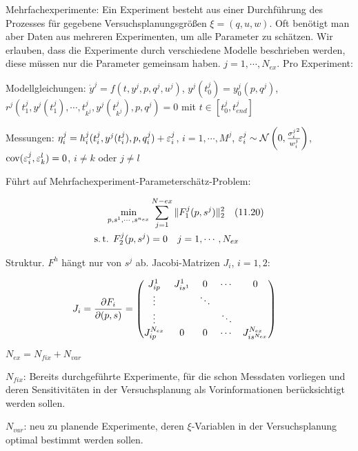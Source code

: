 \bitm
\item Mehrfachexperimente: Ein Experiment besteht aus einer Durchführung des Prozesses für gegebene Versuchsplanungsgrößen $\xi = (q,u,w)$. Oft benötigt man aber Daten aus mehreren Experimenten, um alle Parameter zu schätzen.
Wir erlauben, dass die Experimente durch verschiedene Modelle beschrieben werden, diese müssen nur die Parameter gemeinsam haben. $j=1,\cdots,N_{ex}$. Pro Experiment:
\bitm
\item Modellgleichungen: $\dot y^j = f(t,y^j,p,q^j,u^j)$, $y^j(t_0^j) = y_0^j(p,q^j)$, $r^j(t_1^j, y^j(t_1^j), \cdots, t_{k^j}^j, y^j(t_{k^j}^j), p, q^j) = 0$ mit $t \in [t_0^j, t_{end}^j]$
\item Messungen: $\eta_i^j = h_i^j (t_i^j, y^j(t_i^j),p,q_i^j) + \varepsilon_i^j$, $i = 1,\cdots,M^j$, $\varepsilon_i^j \sim \mathcal N \left(0, \frac{{\sigma_i^j}^2}{w_i^j} \right)$, $\mathrm{cov} (\varepsilon_i^j, \varepsilon_k^l) = 0$, $i\neq k$ oder $j\neq l$
\item
\eitm
\eitm

Führt auf Mehrfachexperiment-Parameterschätz-Problem:

\begin{align*}
\min_{p,s^1, \cdots, s^{n_{ex}}} &\sum\limits_{j=1}^{N-{ex}} \|F_1^j(p,s^j)\|_2^2 \quad (11.20) \\
\text{s.\,t. } F_2^j(p,s^j) &= 0 \quad j = 1,\cdots, N_{ex} \\
\end{align*}

Struktur. $F^h$ hängt nur von $s^j$ ab. Jacobi-Matrizen $J_i$, $i=1,2$:

\begin{align*}
J_i &= \frac{\partial F_i}{\partial (p,s)} = \begin{pmatrix} J_{ip}^1 & J_{is^1}^1 & 0 & \cdots & 0 \\ \vdots & & \ddots \\ \vdots &&& \ddots \\ J_{ip}^{N_{ex}} & 0 & 0 & \cdots & J_{is^{N_{ex}}}^{N_{ex}}  \end{pmatrix}
\end{align*}


$N_{ex} = N_{fix} + N_{var}$

\bitm
\item $N_{fix}$: Bereits durchgeführte Experimente, für die schon Messdaten vorliegen und deren Sensitivitäten in der Versuchsplanung als Vorinformationen berücksichtigt werden sollen.
\item $N_{var}$: neu zu planende Experimente, deren $\xi$-Variablen in der Versuchsplanung optimal bestimmt werden sollen.
\eitm

